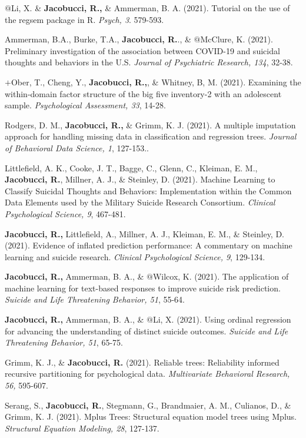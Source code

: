\documentclass[letterpaper,10pt]{article}
\begin{document}
\begin{etaremune}
	\item $@$Li, X. \& \textbf{Jacobucci, R.,} \& Ammerman, B. A. (2021). Tutorial on the use of the regsem package in R. \emph{Psych, 3}. 579-593.
		\item Ammerman, B.A., Burke, T.A., \textbf{Jacobucci, R.}., \& $@$McClure, K. (2021). Preliminary investigation of the association between COVID-19 and suicidal thoughts and behaviors in the U.S. \emph{Journal of Psychiatric Research, 134}, 32-38.
	\item $+$Ober, T., Cheng, Y., \textbf{Jacobucci, R.,}, \& Whitney, B, M. (2021). Examining the within-domain factor structure of the big five inventory-2 with an adolescent sample. \emph{Psychological Assessment, 33}, 14-28.
		\item Rodgers, D. M., \textbf{Jacobucci, R.,} \& Grimm, K. J. (2021). A multiple imputation approach for handling missing data in classification and regression trees. \emph{Journal of Behavioral Data Science, 1}, 127-153..
	\item Littlefield, A. K., Cooke, J. T., Bagge, C., Glenn, C., Kleiman, E. M., \textbf{Jacobucci, R.}, Millner, A. J., \& Steinley, D. (2021). Machine Learning to Classify Suicidal Thoughts and Behaviors: Implementation within the Common Data Elements used by the Military Suicide Research Consortium. \emph{Clinical Psychological Science, 9}, 467-481.
	\item \textbf{Jacobucci, R.,} Littlefield, A., Millner, A. J., Kleiman, E. M., \& Steinley, D. (2021). Evidence of inflated prediction performance: A commentary on machine learning and suicide research. \emph{Clinical Psychological Science, 9}, 129-134.
	\item \textbf{Jacobucci, R.,} Ammerman, B. A., \& $@$Wilcox, K. (2021). The application of machine learning for text-based responses to improve suicide risk prediction. \emph{Suicide and Life Threatening Behavior, 51}, 55-64.
	\item \textbf{Jacobucci, R.,} Ammerman, B. A., \& $@$Li, X. (2021). Using ordinal regression for advancing the understanding of distinct suicide outcomes. \emph{Suicide and Life Threatening Behavior, 51}, 65-75.
	\item Grimm, K. J., \& \textbf{Jacobucci, R.} (2021). Reliable trees: Reliability informed recursive partitioning for psychological data. \emph{Multivariate Behavioral Research, 56,} 595-607.
	\item  Serang, S., \textbf{Jacobucci, R.}, Stegmann, G., Brandmaier, A. M., Culianos, D., \& Grimm, K. J. (2021). Mplus Trees: Structural equation model trees using Mplus. \emph{Structural Equation Modeling, 28}, 127-137.

\end{etaremune}
\end{document}
